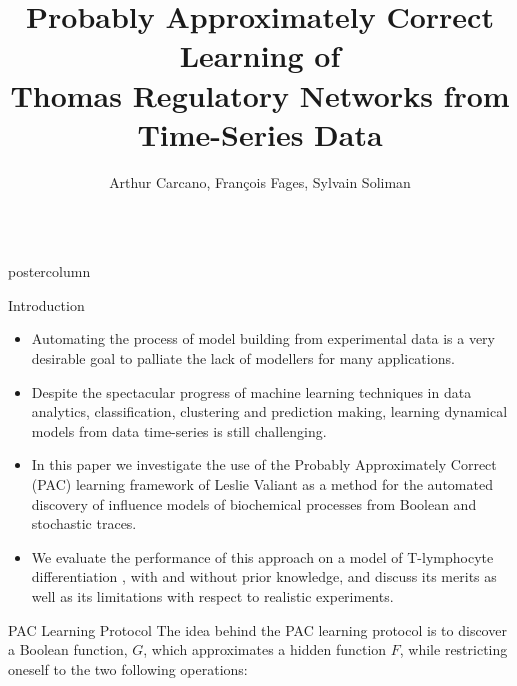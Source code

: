\documentclass[final,hyperref={pdfpagelabels=false},xcolor=dvipsnames]{beamer}
\title{Probably Approximately Correct Learning of\\ Thomas Regulatory Networks from Time-Series Data}
\author{Arthur Carcano, Fran\c{c}ois Fages, Sylvain Soliman}
\institute[Inria, Universit\'e Paris Saclay]{EP Lifeware, Inria, Universit\'e Paris Saclay, France}
\newlength{\columnheight}
\begin{document}
\begin{frame}[fragile]
  \begin{columns}
    \begin{column}{.49\textwidth}
      \begin{beamercolorbox}[center,wd=\textwidth]{postercolumn}
        \begin{minipage}[T]{.95\textwidth}  %
          \parbox[t][\columnheight]{\textwidth}{ %
            \begin{block}{Introduction}
              \begin{itemize}
              \item Automating the process of model building from experimental data 
is a very desirable goal to palliate the lack of modellers for many applications.
\item Despite the spectacular progress of machine learning techniques in data analytics, classification, clustering and prediction making,
learning dynamical models from data time-series is still challenging.
\item In this paper \cite{CFS17cmsb} we investigate the use of the Probably Approximately Correct (PAC) learning 
framework of Leslie Valiant \cite{Valiant84cacm} as a method for the automated discovery of influence models of biochemical processes from Boolean and stochastic traces. 
\item We evaluate the performance of this approach on a model of T-lymphocyte
differentiation \cite{RRMTC06tcsb,Mendoza06biosystems}, with and without prior knowledge,
and discuss its merits as well as its limitations with respect to realistic experiments.
              \end{itemize}              
            \end{block}
            \vfill
            \begin{block}{PAC Learning Protocol}
The idea behind the PAC learning protocol is to discover a Boolean
function, $G$, which approximates a hidden function $F$, while restricting oneself to the two following operations:
\begin{itemize}

\end{itemize}
\end{block}}
\end{minipage}
\end{beamercolorbox}
\end{column}
\end{columns}
\end{frame}
\end{document}
